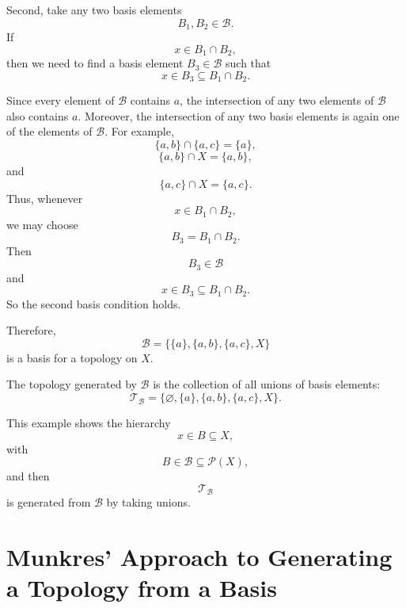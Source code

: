 \documentclass{article}
\begin{document}
	Second, take any two basis elements
	\[
	B_1,B_2\in\mathcal B.
	\]
	If
	\[
	x\in B_1\cap B_2,
	\]
	then we need to find a basis element \(B_3\in\mathcal B\) such that
	\[
	x\in B_3\subseteq B_1\cap B_2.
	\]
	
	Since every element of \(\mathcal B\) contains \(a\), the intersection of any two elements of \(\mathcal B\) also contains \(a\). Moreover, the intersection of any two basis elements is again one of the elements of \(\mathcal B\). For example,
	\[
	\{a,b\}\cap\{a,c\}=\{a\},
	\]
	\[
	\{a,b\}\cap X=\{a,b\},
	\]
	and
	\[
	\{a,c\}\cap X=\{a,c\}.
	\]
	Thus, whenever
	\[
	x\in B_1\cap B_2,
	\]
	we may choose
	\[
	B_3=B_1\cap B_2.
	\]
	Then
	\[
	B_3\in\mathcal B
	\]
	and
	\[
	x\in B_3\subseteq B_1\cap B_2.
	\]
	So the second basis condition holds.
	
	Therefore,
	\[
	\mathcal B=\{\{a\},\{a,b\},\{a,c\},X\}
	\]
	is a basis for a topology on \(X\).
	
	The topology generated by \(\mathcal B\) is the collection of all unions of basis elements:
	\[
	\mathcal T_{\mathcal B}
	=
	\{\varnothing,\{a\},\{a,b\},\{a,c\},X\}.
	\]
	
	This example shows the hierarchy
	\[
	x\in B\subseteq X,
	\]
	with
	\[
	B\in\mathcal B\subseteq\mathcal P(X),
	\]
	and then
	\[
	\mathcal T_{\mathcal B}
	\]
	is generated from \(\mathcal B\) by taking unions.
	
	\section{Munkres' Approach to Generating a Topology from a Basis}
	
\end{document}
